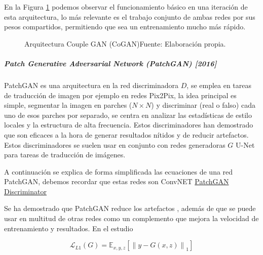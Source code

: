 En la Figura \ref{fig:CoGAN} podemos observar el funcionamiento básico en una iteración de esta arquitectura, lo más relevante es el trabajo  conjunto de ambas redes por sus pesos compartidos, permitiendo que sea un entrenamiento mucho más rápido.

\begin{figure}[H]
    \centering
    \centerline{}
    \caption{Arquitectura Couple GAN (CoGAN)\newline{}Fuente: Elaboración propia.}
    \label{fig:CoGAN}
\end{figure}



\subparagraph{Patch Generative Adversarial Network (PatchGAN) [2016]}

\gls{PatchGAN} \cite{PatchGAN-isola2018imagetoimage} es una arquitectura en la red discriminadora ${D}$, se emplea en tareas de traducción de imagen por ejemplo en redes \gls{Pix2Pix}, la idea principal es simple, segmentar la imagen en parches (${N \times N}$) y discriminar (real o falso) cada uno de esos parches por separado, se centra en analizar las estadísticas de estilo locales y la estructura de alta frecuencia. Estos discriminadores han demostrado que son eficaces a la hora de generar resultados nítidos y de reducir artefactos. Estos discriminadores se suelen usar en conjunto con redes generadoras ${G}$ \gls{U-Net} \cite{U-Net-ronneberger2015unet} para tareas de traducción de imágenes.

A continuación se explica de forma simplificada las ecuaciones de una red \acrshort{PatchGAN}, debemos recordar que estas redes son \acrshort{ConvNET} \href{https://github.com/junyanz/pytorch-CycleGAN-and-pix2pix/issues/39}{PatchGAN Discriminator}

Se ha demostrado que \gls{PatchGAN} reduce los artefactos \cite{PatchGAN-isola2018imagetoimage}, además de que se puede usar en multitud de otras redes como un complemento que mejora la velocidad de entrenamiento y resultados. En el estudio

\begin{equation}
    \mathcal{L}_{L1}(G) = \mathbb{E}_{x,y,z} \left[ {\lVert y - G(x,z) \rVert}_{1} \right]
    \label{eq:L1}
\end{equation}

